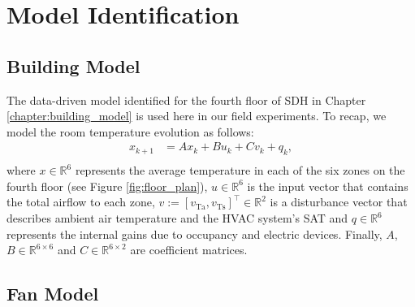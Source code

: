 %
%


\section{Model Identification}\label{sec:model_id}

\subsection{Building Model}
The data-driven model identified for the fourth floor of SDH in Chapter \ref{chapter:building_model} is used here in our field experiments.
To recap, we model the room temperature evolution as follows:
\begin{equation}
\begin{aligned}\label{eq:building_model}
x_{k+1} &= A x_k + B u_k + C v_k + q_k, \\
\end{aligned}
\end{equation}
where $x \in \mathbb{R}^6$ represents the average temperature in each of the six zones on the fourth floor (see Figure \ref{fig:floor_plan}), $u \in \mathbb{R}^6$ is the input vector that contains the total airflow to each zone, $v:= \left[ v_\text{Ta}, v_\text{Ts} \right]^\top \in \mathbb{R}^2$ is a disturbance vector that describes ambient air temperature and the HVAC system's SAT and  $q \in \mathbb{R}^6$ represents the internal gains due to occupancy and electric devices.
Finally, $A$, $B \in \mathbb{R}^{6\times6}$ and $C \in \mathbb{R}^{6\times2}$ are coefficient matrices.




\subsection{Fan Model}

